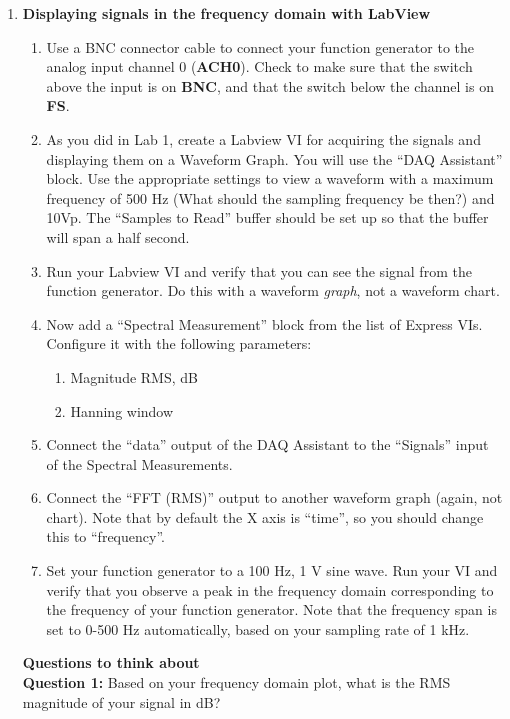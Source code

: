 \documentclass[12pt]{article}
\begin{document}
\begin{enumerate}%

\item {\bf Displaying signals in the frequency domain with LabView}

\begin{enumerate}
\item Use a BNC connector cable to connect your function generator to the analog input channel 0 (\textbf{ACH0}). 
Check to make sure that the switch above the input is on \textbf{BNC}, and that the switch below the channel is on \textbf{FS}.
\item As you did in Lab 1, create a Labview VI for acquiring the signals and displaying them on a Waveform Graph.  
You will use the ``DAQ Assistant'' block. 
Use the appropriate settings to view a waveform with a maximum frequency of 500 Hz (What should the sampling frequency be then?) and 10Vp. 
The ``Samples to Read'' buffer should be set up so that the buffer will span a half second.
\item Run your Labview VI and verify that you can see the signal from the function generator.  
Do this with a waveform {\it graph}, not a waveform chart.  
\item Now add a ``Spectral Measurement'' block from the list of Express VIs.  
Configure it with the following parameters:
	\begin{enumerate}
		\item Magnitude RMS, dB
		\item Hanning window
	\end{enumerate}
\item Connect the ``data'' output of the DAQ Assistant to the ``Signals'' input of the Spectral Measurements.
\item Connect the ``FFT (RMS)'' output to another waveform graph (again, not chart).  
Note that by default the X axis is ``time'', so you should change this to ``frequency''.  
\item Set your function generator to a 100 Hz, 1 V sine wave.  
Run your VI and verify that you observe a peak in the frequency domain corresponding to the frequency of your function generator.  
Note that the frequency span is set to 0-500 Hz automatically, 
based on your sampling rate of 1 kHz.
\end{enumerate}
{\bf Questions to think about}\\
{\bf Question 1:} Based on your frequency domain plot, what is the RMS magnitude of your signal in dB?

\end{enumerate}
\end{document}
